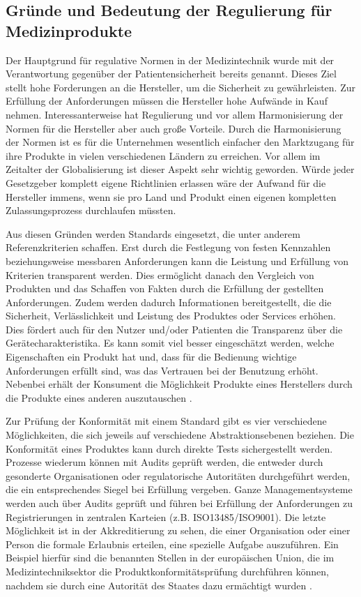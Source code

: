 \documentclass[a4paper,12pt]{report}
\begin{document}
\subsection{Gründe und Bedeutung der Regulierung für Medizinprodukte}\label{subsec:Gruende}
Der Hauptgrund für regulative Normen in der Medizintechnik wurde mit der Verantwortung gegenüber der Patientensicherheit bereits genannt. Dieses Ziel stellt hohe Forderungen an die Hersteller, um die Sicherheit zu gewährleisten. Zur Erfüllung der Anforderungen müssen die Hersteller hohe Aufwände in Kauf nehmen. Interessanterweise hat Regulierung und vor allem Harmonisierung der Normen für die Hersteller aber auch große Vorteile. Durch die Harmonisierung der Normen ist es für die Unternehmen wesentlich einfacher den Marktzugang für ihre Produkte in vielen verschiedenen Ländern zu erreichen. Vor allem im Zeitalter der Globalisierung ist dieser Aspekt sehr wichtig geworden. Würde jeder Gesetzgeber komplett eigene Richtlinien erlassen wäre der Aufwand für die Hersteller immens, wenn sie pro Land und Produkt einen eigenen kompletten Zulassungsprozess durchlaufen müssten.

Aus diesen Gründen werden Standards eingesetzt, die unter anderem Referenzkriterien schaffen. Erst durch die Festlegung von festen Kennzahlen beziehungsweise messbaren Anforderungen kann die Leistung und Erfüllung von Kriterien transparent werden. Dies ermöglicht danach den Vergleich von Produkten und das Schaffen von Fakten durch die Erfüllung der gestellten Anforderungen. Zudem werden dadurch Informationen bereitgestellt, die die Sicherheit, Verlässlichkeit und Leistung des Produktes oder Services erhöhen. Dies fördert auch für den Nutzer und/oder Patienten die Transparenz über die Gerätecharakteristika. Es kann somit viel besser eingeschätzt werden, welche Eigenschaften ein Produkt hat und, dass für die Bedienung wichtige Anforderungen erfüllt sind, was das Vertrauen bei der Benutzung erhöht. Nebenbei erhält der Konsument die Möglichkeit Produkte eines Herstellers durch die Produkte eines anderen auszutauschen \citep[vgl.][S. 19.]{Cheng2003}.

Zur Prüfung der Konformität mit einem Standard gibt es vier verschiedene Möglichkeiten, die sich jeweils auf verschiedene Abstraktionsebenen beziehen. Die Konformität eines Produktes kann durch direkte Tests sichergestellt werden. Prozesse wiederum können mit Audits geprüft werden, die entweder durch gesonderte Organisationen oder regulatorische Autoritäten durchgeführt werden, die ein entsprechendes Siegel bei Erfüllung vergeben. Ganze Managementsysteme werden auch über Audits geprüft und führen bei Erfüllung der Anforderungen zu Registrierungen in zentralen Karteien (z.B. ISO13485/ISO9001). Die letzte Möglichkeit ist in der Akkreditierung zu sehen, die einer Organisation oder einer Person die formale Erlaubnis erteilen, eine spezielle Aufgabe auszuführen. Ein Beispiel hierfür sind die benannten Stellen in der europäischen Union, die im Medizintechniksektor die Produktkonformitätsprüfung durchführen können, nachdem sie durch eine Autorität des Staates dazu ermächtigt wurden \citep[vgl.][S. 19f]{Cheng2003}.
\end{document}
